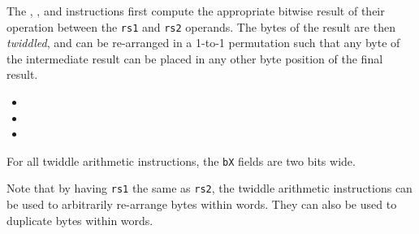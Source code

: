 The , , and  instructions first compute the
appropriate bitwise result of their operation between the {\tt rs1} and
{\tt rs2} operands. The bytes of the result are then {\em twiddled}, and
can be re-arranged in a 1-to-1 permutation such that any byte of the
intermediate result can be placed in any other byte position of the final
result.

\begin{itemize}
\item {}
\item {}
\item {}
\end{itemize}

For all twiddle arithmetic instructions, the {\tt bX} fields are two bits
wide. 

Note that by having {\tt rs1} the same as {\tt rs2}, the twiddle
arithmetic instructions can be used to arbitrarily re-arrange bytes
within words. They can also be used to duplicate bytes within words.

